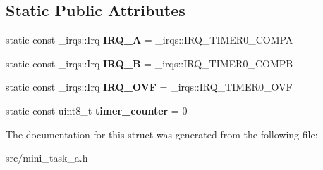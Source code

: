 \subsection*{Static Public Attributes}
\begin{DoxyCompactItemize}
\item 
\hypertarget{struct__timer_1_1Timer0_a3de7fc396d57e150d5b418ee95bd403b}{}\label{struct__timer_1_1Timer0_a3de7fc396d57e150d5b418ee95bd403b} 
static const \+\_\+irqs\+::\+Irq {\bfseries I\+R\+Q\+\_\+A} = \+\_\+irqs\+::\+I\+R\+Q\+\_\+\+T\+I\+M\+E\+R0\+\_\+\+C\+O\+M\+PA
\item 
\hypertarget{struct__timer_1_1Timer0_a0cb6846ecb7f22d0ac2e15fc1e262c42}{}\label{struct__timer_1_1Timer0_a0cb6846ecb7f22d0ac2e15fc1e262c42} 
static const \+\_\+irqs\+::\+Irq {\bfseries I\+R\+Q\+\_\+B} = \+\_\+irqs\+::\+I\+R\+Q\+\_\+\+T\+I\+M\+E\+R0\+\_\+\+C\+O\+M\+PB
\item 
\hypertarget{struct__timer_1_1Timer0_a0513d98f8fe79a9ddd0183bc11560e92}{}\label{struct__timer_1_1Timer0_a0513d98f8fe79a9ddd0183bc11560e92} 
static const \+\_\+irqs\+::\+Irq {\bfseries I\+R\+Q\+\_\+\+O\+VF} = \+\_\+irqs\+::\+I\+R\+Q\+\_\+\+T\+I\+M\+E\+R0\+\_\+\+O\+VF
\item 
\hypertarget{struct__timer_1_1Timer0_a3e3b21ef1c26662d898e509582e6928f}{}\label{struct__timer_1_1Timer0_a3e3b21ef1c26662d898e509582e6928f} 
static const uint8\+\_\+t {\bfseries timer\+\_\+counter} = 0
\end{DoxyCompactItemize}


The documentation for this struct was generated from the following file\+:\begin{DoxyCompactItemize}
\item 
src/mini\+\_\+task\+\_\+a.\+h\end{DoxyCompactItemize}

